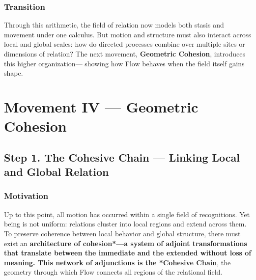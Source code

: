 \documentclass[11pt]{article}
\begin{document}
\subsubsection*{Transition}
\label{sec:org5e7aa7b}
Through this arithmetic, the field of relation now models both stasis and movement under one calculus.  
But motion and structure must also interact across local and global scales:  
how do directed processes combine over multiple sites or dimensions of relation?  
The next movement, \textbf{Geometric Cohesion}, introduces this higher organization—  
showing how Flow behaves when the field itself gains shape.
\section*{Movement IV — Geometric Cohesion}
\label{sec:org5ed3ff1}
\subsection*{Step 1. The Cohesive Chain — Linking Local and Global Relation}
\label{sec:org776de24}

\subsubsection*{Motivation}
\label{sec:org77c8e68}
Up to this point, all motion has occurred within a single field of recognitions.  
Yet being is not uniform: relations cluster into local regions and extend across them.  
To preserve coherence between local behavior and global structure,  
there must exist an \textbf{architecture of cohesion*—a system of adjoint transformations  
that translate between the immediate and the extended without loss of meaning.  
This network of adjunctions is the *Cohesive Chain},  
the geometry through which Flow connects all regions of the relational field.
\end{document}
